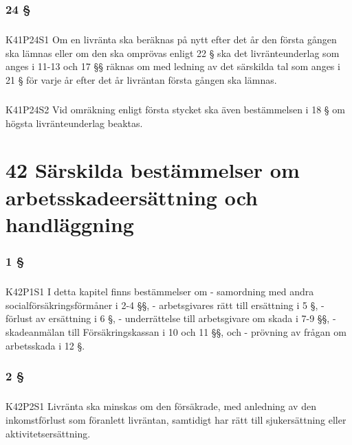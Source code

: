 \documentclass[a4paper,notitlepage,openany,10pt]{book}
\begin{document}
\subsection*{24 §}
\paragraph*{}
{\tiny K41P24S1}
Om en livränta ska beräknas på nytt efter det år den första gången ska lämnas eller om den ska omprövas enligt 22 § ska det livränteunderlag som anges i 11-13 och 17 §§ räknas om med ledning av det särskilda tal som anges i 21 § för varje år efter det år livräntan första gången ska lämnas.
\paragraph*{}
{\tiny K41P24S2}
Vid omräkning enligt första stycket ska även bestämmelsen i 18 § om högsta livränteunderlag beaktas.
\chapter*{42 Särskilda bestämmelser om arbetsskadeersättning och handläggning}
\subsection*{1 §}
\paragraph*{}
{\tiny K42P1S1}
I detta kapitel finns bestämmelser om
\newline - samordning med andra socialförsäkringsförmåner i 2-4 §§,
\newline - arbetsgivares rätt till ersättning i 5 §,
\newline - förlust av ersättning i 6 §,
\newline - underrättelse till arbetsgivare om skada i 7-9 §§,
\newline - skadeanmälan till Försäkringskassan i 10 och 11 §§, och
\newline - prövning av frågan om arbetsskada i 12 §.
\subsection*{2 §}
\paragraph*{}
{\tiny K42P2S1}
Livränta ska minskas om den försäkrade, med anledning av den inkomstförlust som föranlett livräntan, samtidigt har rätt till sjukersättning eller aktivitetsersättning.
\end{document}
